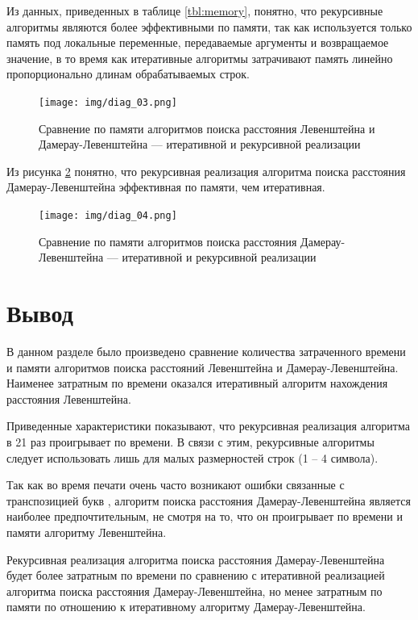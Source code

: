 Из данных, приведенных в таблице \ref{tbl:memory}, понятно, что рекурсивные алгоритмы являются более эффективными по памяти, так как используется только память под локальные переменные, передаваемые аргументы и возвращаемое значение, в то время как итеративные алгоритмы затрачивают память линейно пропорционально длинам обрабатываемых строк.

\begin{figure}[h]
	\centering
	\texttt{[image: img/diag\_03.png]}
	\caption{Сравнение по памяти алгоритмов поиска расстояния Левенштейна и Дамерау-Левенштейна --- итеративной и рекурсивной реализации}
	\label{plt:memory}
\end{figure}

Из рисунка \ref{plt:memory_1} понятно, что рекурсивная реализация алгоритма поиска расстояния Дамерау-Левенштейна эффективная по памяти, чем итеративная.

\begin{figure}[h]
	\centering
	\texttt{[image: img/diag\_04.png]}
	\caption{Сравнение по памяти алгоритмов поиска расстояния Дамерау-Левенштейна --- итеративной и рекурсивной реализации}
	\label{plt:memory_1}
\end{figure}

\clearpage

\section{Вывод}

В данном разделе было произведено сравнение количества затраченного времени и памяти алгоритмов поиска расстояний Левенштейна и Дамерау-Левенштейна. Наименее затратным по времени оказался итеративный алгоритм нахождения расстояния Левенштейна.

Приведенные характеристики показывают, что рекурсивная реализация алгоритма в 21 раз проигрывает по времени. В связи с этим, рекурсивные алгоритмы следует использовать лишь для малых размерностей строк (1 -- 4 символа).

Так как во время печати очень часто возникают ошибки связанные с транспозицией букв \cite{ulianov}, алгоритм поиска расстояния Дамерау-Левенштейна является наиболее предпочтительным, не смотря на то, что он проигрывает по времени и памяти алгоритму Левенштейна.

Рекурсивная реализация алгоритма поиска расстояния Дамерау-Левенштейна будет более затратным по времени по сравнению с итеративной реализацией алгоритма поиска расстояния Дамерау-Левенштейна, но менее затратным по памяти по отношению к итеративному алгоритму Дамерау-Левенштейна.
